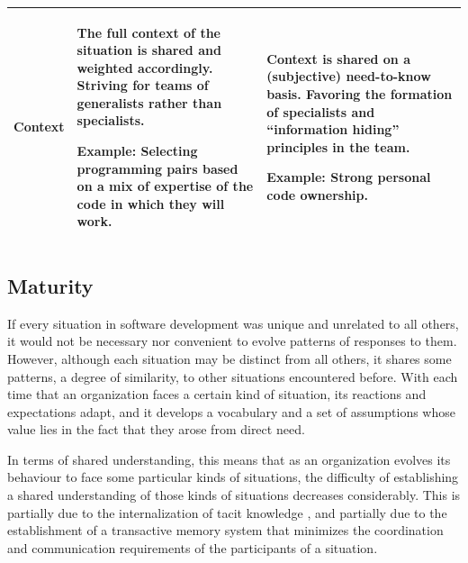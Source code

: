 \begin{table}[tbp]
{\begin{tabular}{p{2.0cm}p{5.8cm}p{5.8cm}}
\hline
\vspace{0.5pt} Context & \vspace{0.5pt} The full context of the situation is shared and weighted accordingly. Striving for teams of generalists rather than specialists. \par Example: Selecting programming pairs based on a mix of expertise of the code in which they will work. & \vspace{0.5pt} Context is shared on a (subjective) need-to-know basis. Favoring the formation of specialists and ``information hiding'' principles in the team. \par Example: Strong personal code ownership.\\
\hline
\end{tabular}}
\end{table}


\subsection{Maturity}
\label{sec:Maturity}

If every situation in software development was unique and unrelated to all others, it would not be necessary nor convenient to evolve patterns of responses to them. However, although each situation may be distinct from all others, it shares some patterns, a degree of similarity, to other situations encountered before. With each time that an organization faces a certain kind of situation, its reactions and expectations adapt, and it develops a vocabulary and a set of assumptions whose value lies in the fact that they arose from direct need.

In terms of shared understanding, this means that as an organization evolves its behaviour to face some particular kinds of situations, the difficulty of establishing a shared understanding of those kinds of situations decreases considerably. This is partially due to the internalization of tacit knowledge \cite{Schon1984}, and partially due to the establishment of a transactive memory system \cite{Wegner1991} that minimizes the coordination and communication requirements of the participants of a situation.

